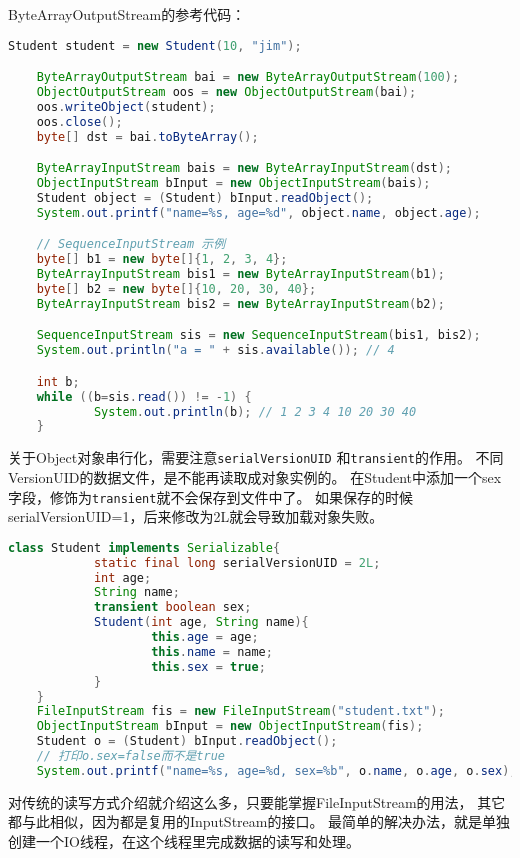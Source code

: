 \noindent
ByteArrayOutputStream的参考代码：
\begin{lstlisting}[language=Java]
	Student student = new Student(10, "jim");

	ByteArrayOutputStream bai = new ByteArrayOutputStream(100);
	ObjectOutputStream oos = new ObjectOutputStream(bai);
	oos.writeObject(student);
	oos.close();
	byte[] dst = bai.toByteArray();

	ByteArrayInputStream bais = new ByteArrayInputStream(dst);
	ObjectInputStream bInput = new ObjectInputStream(bais);
	Student object = (Student) bInput.readObject();
	System.out.printf("name=%s, age=%d", object.name, object.age);

	// SequenceInputStream 示例
	byte[] b1 = new byte[]{1, 2, 3, 4};
	ByteArrayInputStream bis1 = new ByteArrayInputStream(b1);
	byte[] b2 = new byte[]{10, 20, 30, 40};
	ByteArrayInputStream bis2 = new ByteArrayInputStream(b2);

	SequenceInputStream sis = new SequenceInputStream(bis1, bis2);
	System.out.println("a = " + sis.available()); // 4

	int b;
	while ((b=sis.read()) != -1) {
			System.out.println(b); // 1 2 3 4 10 20 30 40
	}
\end{lstlisting}
\noindent

关于Object对象串行化，需要注意\lstinline{serialVersionUID}
和\lstinline{transient}的作用。
不同VersionUID的数据文件，是不能再读取成对象实例的。
在Student中添加一个sex字段，修饰为\lstinline{transient}就不会保存到文件中了。
如果保存的时候serialVersionUID=1，后来修改为2L就会导致加载对象失败。
\vspace{0.6cm}

\begin{lstlisting}[language=Java]
	class Student implements Serializable{
			static final long serialVersionUID = 2L;
			int age;
			String name;
			transient boolean sex;
			Student(int age, String name){
					this.age = age;
					this.name = name;
					this.sex = true;
			}
	}
	FileInputStream fis = new FileInputStream("student.txt");
	ObjectInputStream bInput = new ObjectInputStream(fis);
	Student o = (Student) bInput.readObject();
	// 打印o.sex=false而不是true
	System.out.printf("name=%s, age=%d, sex=%b", o.name, o.age, o.sex);
\end{lstlisting}

对传统的读写方式介绍就介绍这么多，只要能掌握FileInputStream的用法，
其它都与此相似，因为都是复用的InputStream的接口。
最简单的解决办法，就是单独创建一个IO线程，在这个线程里完成数据的读写和处理。

